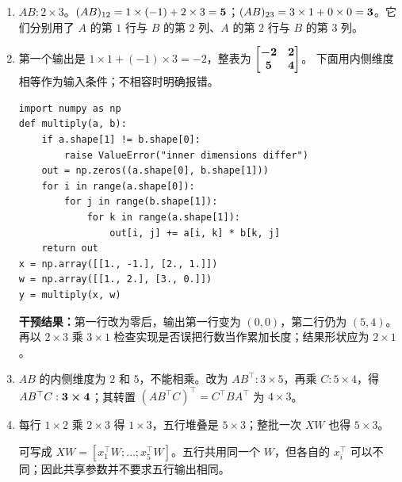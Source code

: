 \begin{enumerate}[label={},leftmargin=4.8em,itemsep=4pt]
\item[\textbf{\hyperref[exercise:matrix-single-entry]{C-029.}}] \leavevmode{}\label{solution:C-029}\label{solution:matrix-single-entry}$AB:2\times3$。$(AB)_{12}=1\times(-1)+2\times3=\boldsymbol{5}$；$(AB)_{23}=3\times1+0\times0=\boldsymbol{3}$。它们分别用了 $A$ 的第 $1$ 行与 $B$ 的第 $2$ 列、$A$ 的第 $2$ 行与 $B$ 的第 $3$ 列。
\item[\textbf{\hyperref[exercise:matrix-batch-calculation]{C-030.}}] \leavevmode{}\label{solution:C-030}\label{solution:matrix-batch-calculation}第一个输出是 $1\times1+(-1)\times3=-2$，整表为 $\boldsymbol{\begin{bmatrix}-2&2\\5&4\end{bmatrix}}$。
下面用内侧维度相等作为输入条件；不相容时明确报错。\par\nobreak
\begin{samepage}\begin{verbatim}
import numpy as np
def multiply(a, b):
    if a.shape[1] != b.shape[0]:
        raise ValueError("inner dimensions differ")
    out = np.zeros((a.shape[0], b.shape[1]))
    for i in range(a.shape[0]):
        for j in range(b.shape[1]):
            for k in range(a.shape[1]):
                out[i, j] += a[i, k] * b[k, j]
    return out
x = np.array([[1., -1.], [2., 1.]])
w = np.array([[1., 2.], [3., 0.]])
y = multiply(x, w)
\end{verbatim}\end{samepage}
\textbf{干预结果：}第一行改为零后，输出第一行变为 $(0,0)$，第二行仍为 $(5,4)$。
再以 $2\times3$ 乘 $3\times1$ 检查实现是否误把行数当作累加长度；结果形状应为 $2\times1$。
\item[\textbf{\hyperref[exercise:matrix-shape-correction]{C-031.}}] \leavevmode{}\label{solution:C-031}\label{solution:matrix-shape-correction}$AB$ 的内侧维度为 $2$ 和 $5$，不能相乘。改为 $AB^\top:3\times5$，再乘 $C:5\times4$，得 $AB^\top C:\boldsymbol{3\times4}$；其转置 $(AB^\top C)^\top=C^\top BA^\top$ 为 $4\times3$。
\item[\textbf{\hyperref[exercise:batch-matrix-sharing]{C-032.}}] \leavevmode{}\label{solution:C-032}\label{solution:batch-matrix-sharing}每行 $1\times2$ 乘 $2\times3$ 得 $1\times3$，五行堆叠是 $5\times3$；整批一次 $XW$ 也得 $5\times3$。\par 可写成 $XW=[x_1^\top W;\ldots;x_5^\top W]$。五行共用同一个 $W$，但各自的 $x_i^\top$ 可以不同；因此共享参数并不要求五行输出相同。

\end{enumerate}
